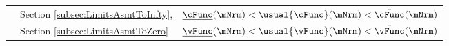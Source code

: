 \begin{table}
{\begin{tabular}{|l|l|l|}
{        }                                                                                                                       & Section \ref{subsec:LimitsAsmtToInfty}, & $\underline{\cFunc}(\mNrm) < \usual{\cFunc}(\mNrm) < \bar{\cFunc}(\mNrm)$ %
        \\                                                                                                                      & Section \ref{subsec:LimitsAsmtToZero}   & $\underline{\vFunc}(\mNrm) < \usual{\vFunc}(\mNrm) < \bar{\vFunc}(\mNrm)$ %


\end{tabular}}
\end{table}
